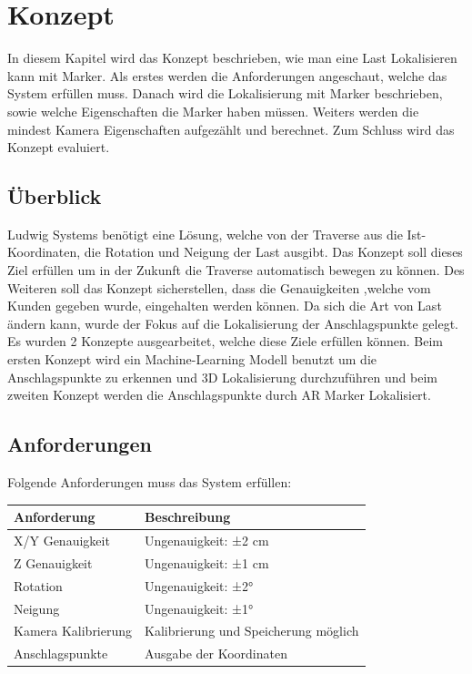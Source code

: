 \section{Konzept}

In diesem Kapitel wird das Konzept beschrieben, wie man eine Last Lokalisieren kann mit Marker.
Als erstes werden die Anforderungen angeschaut, welche das System erfüllen muss. 
Danach wird die Lokalisierung mit Marker beschrieben, sowie welche Eigenschaften die Marker haben müssen.
Weiters werden die mindest Kamera Eigenschaften aufgezählt und berechnet.
Zum Schluss wird das Konzept evaluiert.

\subsection{Überblick}
Ludwig Systems benötigt eine Lösung, welche von der Traverse aus die Ist-Koordinaten, die Rotation und Neigung der Last ausgibt. Das Konzept soll dieses Ziel erfüllen um in der Zukunft die Traverse automatisch bewegen zu können. Des Weiteren soll das Konzept sicherstellen, dass die Genauigkeiten ,welche vom Kunden gegeben wurde, eingehalten werden können. 
Da sich die Art von Last ändern kann, wurde der Fokus auf die Lokalisierung der Anschlagspunkte gelegt. 
Es wurden 2 Konzepte ausgearbeitet, welche diese Ziele erfüllen können. Beim ersten Konzept wird ein Machine-Learning Modell benutzt um die Anschlagspunkte zu erkennen und 3D Lokalisierung durchzuführen und beim zweiten Konzept werden die Anschlagspunkte durch AR Marker 
Lokalisiert.

\subsection{Anforderungen}\label{requirements}

Folgende Anforderungen muss das System erfüllen:

\begin{center}
    \begin{tabular}{ |l|l| }
        \hline
        \textbf{Anforderung} & \textbf{Beschreibung} \\ \hline
        X/Y Genauigkeit & Ungenauigkeit: ±2 cm \\ \hline
        Z Genauigkeit & Ungenauigkeit: ±1 cm \\ \hline
        Rotation & Ungenauigkeit: ±2° \\ \hline
        Neigung & Ungenauigkeit: ±1° \\ \hline
        Kamera Kalibrierung & Kalibrierung und Speicherung möglich \\ \hline
        Anschlagspunkte & Ausgabe der Koordinaten \\ \hline
    \end{tabular}
    \end{center}


